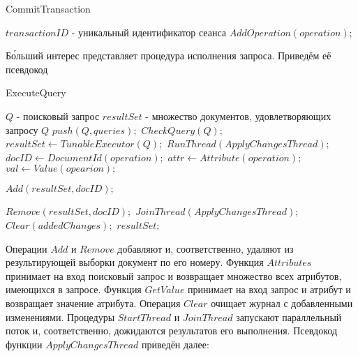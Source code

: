 \documentclass{matmex-diploma}
\begin{document}
        \begin{algorithm}[H]                   
        \caption{CommitTransaction}              
        \label{commitTran2}                        
            \begin{algorithmic}
                \REQUIRE $transactionID$ - уникальный идентификатор сеанса
                    \STATE $AddOperation(operation);$
                \ENDFOR
            \end{algorithmic}
        \end{algorithm}
        
        Б\'{о}льший интерес представляет процедура исполнения запроса. Приведём её псевдокод
        
        \begin{algorithm}[H]
        \caption{ExecuteQuery}
        \label{exec1}
            \begin{algorithmic}
                \REQUIRE $Q$ - поисковый запрос
                \ENSURE $resultSet$ - множество документов, удовлетворяющих запросу $Q$
                \STATE $push(Q, queries);$
                \STATE $CheckQuery(Q);$
                \STATE $resultSet \leftarrow TunableExecutor(Q);$
                \STATE $RunThread(ApplyChangesThread);$
                    \STATE $docID \leftarrow DocumentId(operation);$
                    \STATE $attr \leftarrow Attribute(operation);$
                    \STATE $val \leftarrow Value(opearion);$
                    
                            \STATE $Add(resultSet, docID);$
                        \ENDIF
                        
                    \ENDIF
                    
                            \STATE $Remove(resultSet, docID);$
                        \ENDIF
                    \ENDIF
                \ENDFOR
                \STATE $JoinThread(ApplyChangesThread);$
                \STATE $Clear(addedChanges);$
                \RETURN $resultSet;$
            \end{algorithmic}
        \end{algorithm}
        
        Операции $Add$ и $Remove$ добавляют и, соответственно, удаляют из результирующей выборки документ по его номеру. Функция $Attributes$ принимает на вход поисковый запрос и возвращает множество всех атрибутов, имеющихся в запросе. Функция $GetValue$ принимает на вход запрос и атрибут и возвращает значение атрибута. Операция $Clear$ очищает журнал с добавленными изменениями. Процедуры $StartThread$ и $JoinThread$ запускают параллельный поток и, соответственно, дожидаются результатов его выполнения. Псевдокод функции $ApplyChangesThread$ приведён далее:
        
\end{document}
